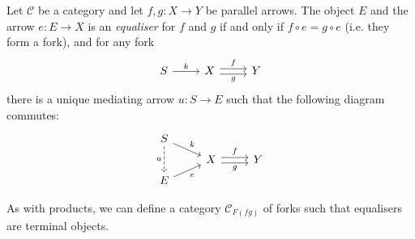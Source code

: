 \documentclass[article, a4paper, 11pt, oneside]{memoir}
\numberwithin{equation}{chapter}
\newcommand{\cat}[1]{\mathcal{#1}}
\newcommand{\catC}{\cat{C}}
\theoremstyle{myexample}
\theoremstyle{myexamplebreak}
\begin{document}
\begin{definition}[Equalisers]
    Let $\catC$ be a category and let $f,g \colon X \to Y$ be parallel arrows. The object $E$ and the arrow $e \colon E \to X$ is an \emph{equaliser} for $f$ and $g$ if and only if $f \circ e = g \circ e$ (i.e. they form a fork), and for any fork
    \begin{equation*}
        \begin{tikzcd}
            S
                \ar[r, "k"]
            & X
                \ar[r, "f", shift left]
                \ar[r, "g", shift right, swap]
            & Y
        \end{tikzcd}
    \end{equation*}
    there is a unique mediating arrow $u \colon S \to E$ such that the following diagram commutes:
    \begin{equation*}
        \begin{tikzcd}[row sep=tiny]
            S
                \ar[dr, "k"]
                \ar[dd, "u", swap, dashed]
            \\
            & X
                \ar[r, "f", shift left]
                \ar[r, "g", shift right, swap]
            & Y
            \\
            E
                \ar[ur, "e", swap]
        \end{tikzcd}
    \end{equation*}
\end{definition}
%
As with products, we can define a category $\catC_{F(fg)}$ of forks such that equalisers are terminal objects. 
\end{document}
